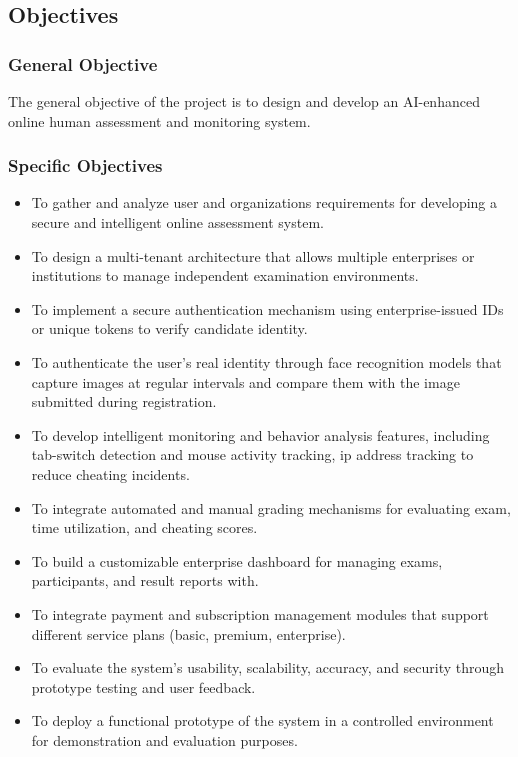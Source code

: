 \subsection{Objectives}
\subsubsection{General Objective}
The general objective of the project is to design and develop an AI-enhanced online human assessment and monitoring system.

\subsubsection{Specific Objectives}
\begin{itemize}
    \item To gather and analyze user and organizations requirements for developing a secure and intelligent online assessment system.
    \item To design a multi-tenant architecture that allows multiple enterprises or institutions to manage independent examination environments.
    \item To implement a secure authentication mechanism using enterprise-issued IDs or unique tokens to verify candidate identity.
    \item To authenticate the user's real identity through face recognition models that capture images at regular intervals and compare them with the image submitted during registration.
    \item To develop intelligent monitoring and behavior analysis features, including tab-switch detection and mouse activity tracking, ip address tracking to reduce cheating incidents.
    \item To integrate automated and manual grading mechanisms for evaluating exam, time utilization, and cheating scores.
    \item To build a customizable enterprise dashboard for managing exams, participants, and result reports with.
    \item To integrate payment and subscription management modules that support different service plans (basic, premium, enterprise).
    \item To evaluate the system’s usability, scalability, accuracy, and security through prototype testing and user feedback.
    \item To deploy a functional prototype of the system in a controlled environment for demonstration and evaluation purposes.
    
\end{itemize}

